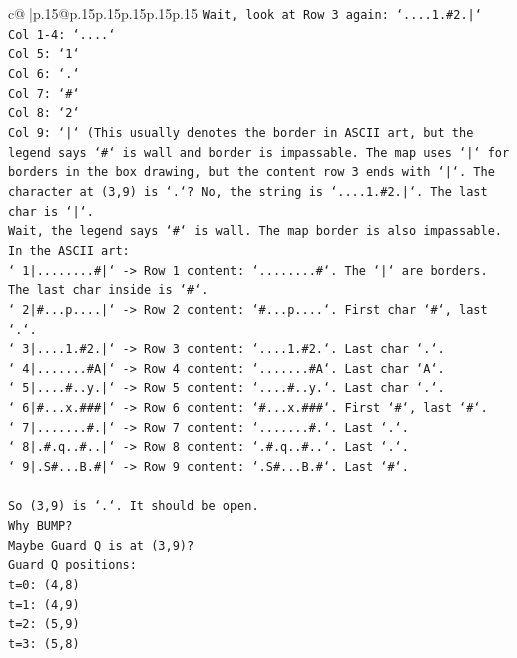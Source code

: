 \documentclass{article}
\begin{document}
{\begin{supertabular}{c@{$\;$}|p{.15\linewidth}@{}p{.15\linewidth}p{.15\linewidth}p{.15\linewidth}p{.15\linewidth}p{.15\linewidth}}
{{{\texttt{Wait, look at Row 3 again: `....1.\#2.|`} \\
\texttt{Col 1{-}4: `....`} \\
\texttt{Col 5: `1`} \\
\texttt{Col 6: `.`} \\
\texttt{Col 7: `\#`} \\
\texttt{Col 8: `2`} \\
\texttt{Col 9: `|` (This usually denotes the border in ASCII art, but the legend says `\#` is wall and border is impassable. The map uses `|` for borders in the box drawing, but the content row 3 ends with `|`. The character at (3,9) is `.`? No, the string is `....1.\#2.|`. The last char is `|`.} \\
\texttt{Wait, the legend says `\#` is wall. The map border is also impassable.} \\
\texttt{In the ASCII art:} \\
\texttt{` 1|........\#|` {-}> Row 1 content: `........\#`. The `|` are borders. The last char inside is `\#`.} \\
\texttt{` 2|\#...p....|` {-}> Row 2 content: `\#...p....`. First char `\#`, last `.`.} \\
\texttt{` 3|....1.\#2.|` {-}> Row 3 content: `....1.\#2.`. Last char `.`.} \\
\texttt{` 4|.......\#A|` {-}> Row 4 content: `.......\#A`. Last char `A`.} \\
\texttt{` 5|....\#..y.|` {-}> Row 5 content: `....\#..y.`. Last char `.`.} \\
\texttt{` 6|\#...x.\#\#\#|` {-}> Row 6 content: `\#...x.\#\#\#`. First `\#`, last `\#`.} \\
\texttt{` 7|.......\#.|` {-}> Row 7 content: `.......\#.`. Last `.`.} \\
\texttt{` 8|.\#.q..\#..|` {-}> Row 8 content: `.\#.q..\#..`. Last `.`.} \\
\texttt{` 9|.S\#...B.\#|` {-}> Row 9 content: `.S\#...B.\#`. Last `\#`.} \\
\\ 
\texttt{So (3,9) is `.`. It should be open.} \\
\texttt{Why BUMP?} \\
\texttt{Maybe Guard Q is at (3,9)?} \\
\texttt{Guard Q positions:} \\
\texttt{t=0: (4,8)} \\
\texttt{t=1: (4,9)} \\
\texttt{t=2: (5,9)} \\
\texttt{t=3: (5,8)} \\
}}}
\end{supertabular}}
\end{document}
